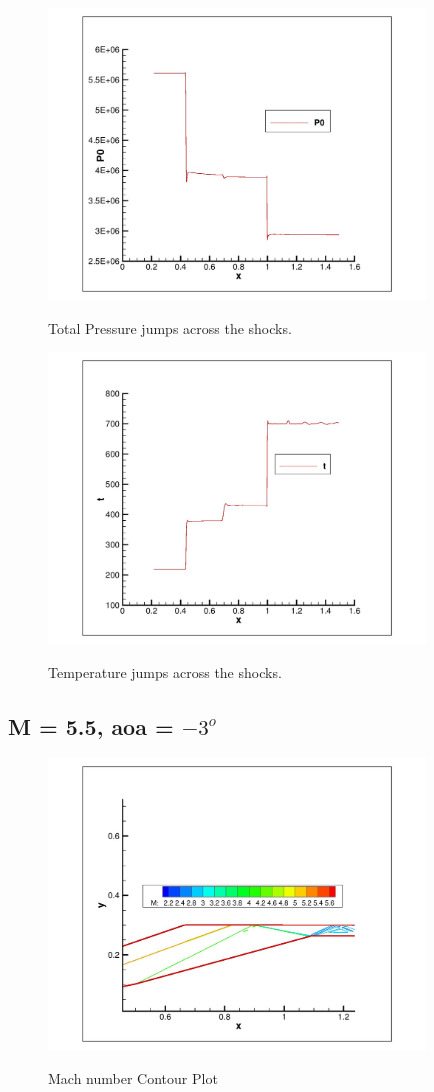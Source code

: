 \documentclass{article}
\begin{document}
\begin{figure}[H]   \label{figure}
\includegraphics[width=10cm]{6.5/P_total_1.jpg}		%
\label{figure:}
\caption{Total Pressure jumps across the shocks.}
\end{figure}

\begin{figure}[H]   \label{figure}
\includegraphics[width=10cm]{6.5/Temp_1.jpg}		%
\label{figure:}
\caption{Temperature jumps across the shocks.}
\end{figure}

\newpage
\subsection*{M = 5.5, aoa = $-3^o$}
\begin{figure}[H]   \label{figure}
\includegraphics[width=10cm]{5.5/M_cont_2.jpg}		%
\label{figure:}
\caption{Mach number Contour Plot}
\end{figure}
\end{document}
